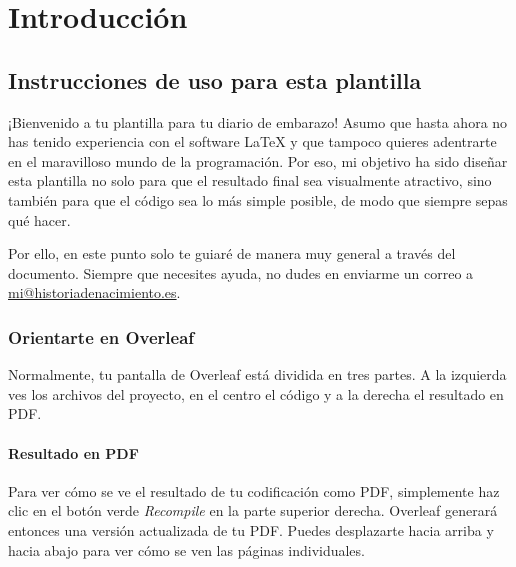 \part*{Introducción}


\chapter{Instrucciones de uso para esta plantilla}

¡Bienvenido a tu plantilla para tu diario de embarazo! Asumo que hasta ahora no has tenido experiencia con el software \LaTeX{} y que tampoco quieres adentrarte en el maravilloso mundo de la programación. Por eso, mi objetivo ha sido diseñar esta plantilla no solo para que el resultado final sea visualmente atractivo, sino también para que el código sea lo más simple posible, de modo que siempre sepas qué hacer.

Por ello, en este punto solo te guiaré de manera muy general a través del documento. Siempre que necesites ayuda, no dudes en enviarme un correo a \href{mailto:mi@historiadenacimiento.es}{mi@historiadenacimiento.es}.

\section{Orientarte en Overleaf}

Normalmente, tu pantalla de Overleaf está dividida en tres partes. A la izquierda ves los archivos del proyecto, en el centro el código y a la derecha el resultado en PDF.

\subsection{Resultado en PDF}
Para ver cómo se ve el resultado de tu codificación como PDF, simplemente haz clic en el botón verde \emph{Recompile} en la parte superior derecha. Overleaf generará entonces una versión actualizada de tu PDF. Puedes desplazarte hacia arriba y hacia abajo para ver cómo se ven las páginas individuales.

